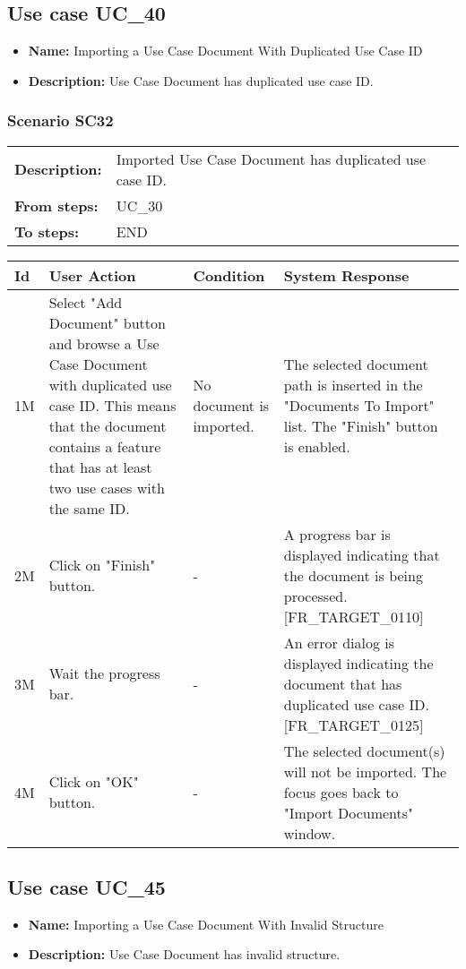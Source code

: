\documentclass[a4paper,11pt]{article}
\newcommand{\bl}{\\ \hline}
\begin{document}
\subsection*{Use case UC_40}
\begin{itemize}
\item {\bf Name: }Importing a Use Case Document With Duplicated Use Case ID
			
\item {\bf Description: }Use Case Document has duplicated use case ID.
			
\end{itemize}
\subsubsection*{Scenario SC32}
\begin{tabular}{p{1in}p{4in}}
{\bf Description:} & Imported Use Case Document has duplicated use case ID.
				 \\
{\bf From steps:} & UC_30#2M \\
{\bf To steps:} & END \\
\end{tabular}
 
\begin{tabular}{|p{0.8in}|p{1.6in}|p{1.6in}|p{1.6in}|}
\hline
Id & User Action & Condition & System Response  \bl 
1M & Select "Add Document" button and browse a Use Case Document
						with duplicated use case ID. This means that the document contains
						a feature that has at least two use cases with the same ID.
					 & No document is imported. & The selected document path is inserted in the "Documents
						To Import" list. The "Finish" button is enabled. \bl 
2M & Click on "Finish" button. & - & A progress bar is displayed indicating that the document
						is being processed. [FR_TARGET_0110] \bl 
3M & Wait the progress bar.  & - & An error dialog is displayed indicating the document that
						has duplicated use case ID. [FR_TARGET_0125]  \bl 
4M & Click on "OK" button. & - & The selected document(s) will not be imported. The focus
						goes back to "Import Documents" window. \bl 
\end{tabular}
\subsection*{Use case UC_45}
\begin{itemize}
\item {\bf Name: }Importing a Use Case Document With Invalid Structure
\item {\bf Description: }Use Case Document has invalid structure.
\end{itemize}
\end{document}
